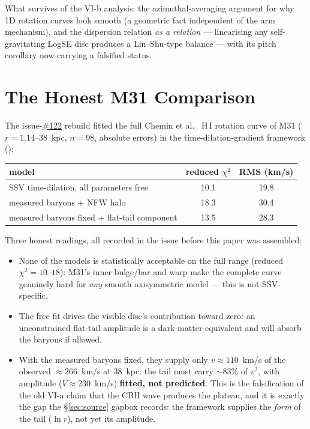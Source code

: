 \documentclass[11pt,a4paper]{article}
\providecommand{\ssvfile}[1]{\hyperref[file:#1]{\texttt{\detokenize{#1}}}}
\providecommand{\ssvissue}[1]{\hyperref[issue:#1]{\##1}}
\begin{document}
What survives of the VI-b analysis: the azimuthal-averaging argument for
why 1D rotation curves look smooth (a geometric fact independent of the
arm mechanism), and the dispersion relation \emph{as a relation} ---
linearising any self-gravitating LogSE disc produces a Lin--Shu-type
balance --- with its pitch corollary now carrying a falsified status.

\section{The Honest M31 Comparison}
\label{sec:m31}

The issue-\ssvissue{122} rebuild fitted the full Chemin et
al.~\cite{chemin2009} H\,I rotation curve of M31 ($r = 1.14$--$38$~kpc,
$n = 98$, absolute errors) in the time-dilation-gradient framework
(\ssvfile{timedilation-rotation-curve-result}):

\begin{center}\small
\begin{tabular}{@{}lcc@{}}
\toprule
model & reduced $\chi^2$ & RMS (km/s) \\
\midrule
SSV time-dilation, all parameters free & 10.1 & 19.8 \\
measured baryons + NFW halo \cite{nfw1997} & 18.3 & 30.4 \\
measured baryons fixed + flat-tail component & 13.5 & 28.3 \\
\bottomrule
\end{tabular}
\end{center}

Three honest readings, all recorded in the issue before this paper was
assembled:
\begin{itemize}
  \item None of the models is statistically acceptable on the full range
    (reduced $\chi^2 = 10$--$18$): M31's inner bulge/bar and warp make
    the complete curve genuinely hard for \emph{any} smooth
    axisymmetric model --- this is not SSV-specific.
  \item The free fit drives the visible disc's contribution toward zero:
    an unconstrained flat-tail amplitude is a dark-matter-equivalent and
    will absorb the baryons if allowed.
  \item With the measured baryons fixed, they supply only
    $v \approx 110$~km/s of the observed $\approx 266$~km/s at 38~kpc:
    the tail must carry $\sim$83\% of $v^2$, with amplitude
    ($V \approx 230$~km/s) \textbf{fitted, not predicted}.  This is the
    falsification of the old VI-a claim that the CBH wave produces the
    plateau, and it is exactly the gap the \S\ref{sec:source} gapbox
    records: the framework supplies the \emph{form} of the tail
    ($\ln r$), not yet its amplitude.
\end{itemize}
\end{document}
